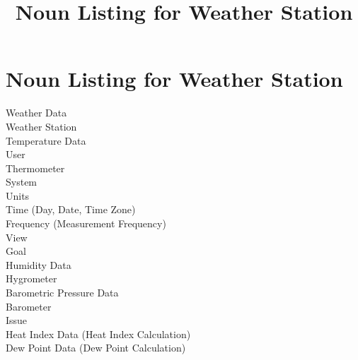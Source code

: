 \documentclass[letterpaper]{article}
\title{Noun Listing for Weather Station}
\begin{document}
\noindent
\section{Noun Listing for Weather Station}
Weather Data\\
Weather Station\\
Temperature Data\\
User\\
Thermometer\\
System\\
Units\\
Time (Day, Date, Time Zone)\\
Frequency (Measurement Frequency)\\
View\\
Goal\\
Humidity Data\\
Hygrometer\\
Barometric Pressure Data\\
Barometer\\
Issue\\
Heat Index Data (Heat Index Calculation)\\
Dew Point Data (Dew Point Calculation)\\
\end{document}
